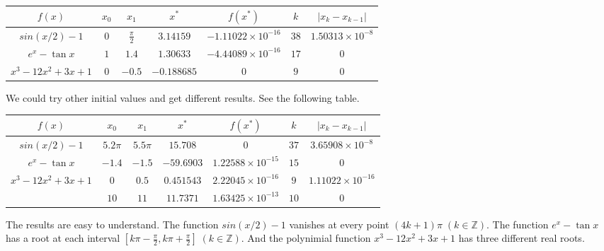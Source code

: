 \documentclass[11pt,en]{elegantpaper}
\begin{document}
\begin{table}[htbp]
  \centering
  \begin{tabular}{|c|c|c|c|c|c|c|}
  \hline
  \textbf{$f(x)$}  & \textbf{$x_0$} & \textbf{$x_1$}  & \textbf{$x^*$} & \textbf{$f(x^*)$}         & \textbf{$k$} & \textbf{$|x_k-x_{k-1}|$} \\ \hline
  $sin(x/2)-1$     & $0$            & $\frac{\pi}{2}$ & $3.14159$      & $-1.11022\times 10^{-16}$ & $38$         & $1.50313\times 10^{-8}$  \\ \hline
  $e^x-\tan x$     & $1$            & $1.4$           & $1.30633$      & $-4.44089\times 10^{-16}$ & $17$         & $0$                      \\ \hline
  $x^3-12x^2+3x+1$ & $0$            & $-0.5$          & $-0.188685$    & $0$                       & $9$          & $0$                      \\ \hline
  \end{tabular}
\end{table}

We could try other initial values and get different results. See the following table.

\begin{table}[htbp]
  \centering
  \begin{tabular}{|c|c|c|c|c|c|c|}
  \hline
  \textbf{$f(x)$}                   & \textbf{$x_0$} & \textbf{$x_1$} & \textbf{$x^*$} & \textbf{$f(x^*)$}        & \textbf{$k$} & \textbf{$|x_k-x_{k-1}|$} \\ \hline
  $sin(x/2)-1$                      & $5.2\pi$       & $5.5\pi$       & $15.708$       & $0$                      & $37$         & $3.65908\times 10^{-8}$  \\ \hline
  $e^x-\tan x$                      & $-1.4$         & $-1.5$         & $-59.6903$     & $1.22588\times 10^{-15}$ & $15$         & $0$                      \\ \hline
  \multirow{2}{*}{$x^3-12x^2+3x+1$} & $0$            & $0.5$          & $0.451543$     & $2.22045\times 10^{-16}$ & $9$          & $1.11022\times 10^{-16}$ \\ \cline{2-7} 
                                    & $10$           & $11$           & $11.7371$      & $1.63425\times 10^{-13}$ & $10$         & $0$                      \\ \hline
  \end{tabular}
\end{table}

The results are easy to understand. The function $sin(x/2)-1$ vanishes at every point $(4k+1)\pi\;(k\in\mathbb{Z})$. The function $e^x-\tan x$ has a root at each interval $[k\pi-\frac{\pi}{2},k\pi+\frac{\pi}{2}]\;(k\in \mathbb{Z})$. And the polynimial function $x^3-12x^2+3x+1$ has three different real roots.
\end{document}
